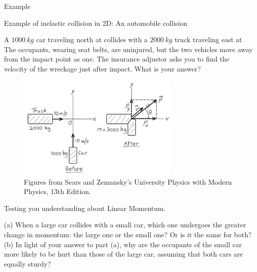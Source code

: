 \documentclass[]{beamer}
\begin{document}

\begin{frame}
    Example
    \vspace{3mm}
    
Example of inelastic collision in 2D: An automobile collision
\vspace{3mm}


A $1000~kg$ car traveling north at collides with a $2000~kg$
truck traveling east at The occupants, wearing seat belts,
are uninjured, but the two vehicles move away from the impact
point as one. The insurance adjustor asks you to find the velocity
of the wreckage just after impact. What is your answer?

\begin{figure}[h!]  
    \includegraphics[width=0.7\textwidth]{images/7.jpg}
    \caption{ {\tiny Figures from Sears and Zemansky's University Physics 
    with Modern Physics, 13th Edition.} }
  \end{figure}

    
    
    \end{frame}


\begin{frame}

Testing you understanding about Linear Momentum.
\vspace{7mm}

(a) When a large car collides with a small car, which one undergoes
the greater change in momentum: the large one or the small
one? Or is it the same for both? (b) In light of your answer to part (a),
why are the occupants of the small car more likely to be hurt than
those of the large car, assuming that both cars are equally sturdy?

 \end{frame}
\end{document}
